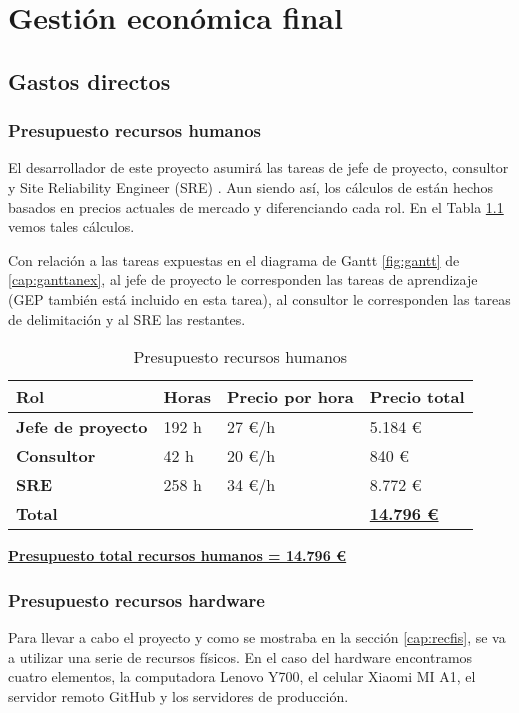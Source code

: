 \chapter{Gestión económica final}\label{cap:gestionec}
\section{Gastos directos}
\subsection{Presupuesto recursos humanos}
El desarrollador de este proyecto asumirá las tareas de jefe de proyecto, consultor y Site Reliability Engineer (SRE) \cite{Tfg:sre}. Aun siendo así, los cálculos de están hechos basados en precios actuales de mercado y diferenciando cada rol. En el Tabla \ref{tab:preprechum} vemos tales cálculos.

Con relación a las tareas expuestas en el diagrama de Gantt \ref{fig:gantt} de \ref{cap:ganttanex}, al jefe de proyecto le corresponden las tareas de aprendizaje (GEP también está incluido en esta tarea), al consultor le corresponden las tareas de delimitación y al SRE las restantes.


\begin{table}[H]\label{tab:preprechum}
	\centering
	\begin{tabular}{|l|l|l|l|}
		\hline
		\textbf{Rol}              & \textbf{Horas} & \textbf{Precio por hora}         & \textbf{Precio total}  \\ \hline
		\textbf{Jefe de proyecto} & 192 h          & 27 €/h \cite{Tfg:projectmanager} & 5.184 €                \\ \hline
		\textbf{Consultor}        & 42 h           & 20 €/h \cite{Tfg:itconsultant}   & 840 €                  \\ \hline
		\textbf{SRE}              & 258 h          & 34 €/h \cite{Tfg:sresalary}      & 8.772 €                \\ \hline
		\multicolumn{3}{|l|}{\textbf{Total}} & \textbf{\underline{14.796 €}}                                   \\ \hline
	\end{tabular}
	\caption{Presupuesto recursos humanos}
\end{table}


\textbf{\underline{Presupuesto total recursos humanos = 14.796 €}}

\subsection{Presupuesto recursos hardware}
Para llevar a cabo el proyecto y como se mostraba en la sección \ref{cap:recfis}, se va a utilizar una serie de recursos físicos. En el caso del hardware encontramos cuatro elementos, la computadora Lenovo Y700, el celular Xiaomi MI A1, el servidor remoto GitHub y los servidores de producción. 

